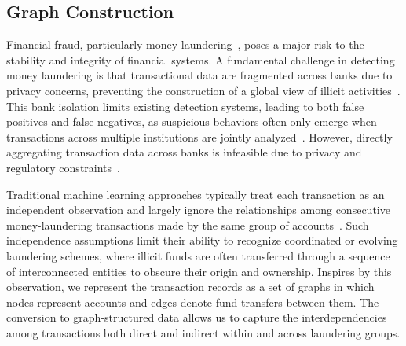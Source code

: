 \subsection{Graph Construction}
Financial fraud, particularly money laundering~\parencite{chen2018machine}, poses a major risk to the stability and integrity of financial systems. A fundamental challenge in detecting money laundering is that transactional data are fragmented across banks due to privacy concerns, preventing the construction of a global view of illicit activities~\parencite{le2018preventing, van2024privacy}. This bank isolation limits existing detection systems, leading to both false positives and false negatives, as suspicious behaviors often only emerge when transactions across multiple institutions are jointly analyzed~\parencite{wang2024temporal, amoako2025exploring}. However, directly aggregating transaction data across banks is infeasible due to privacy and regulatory constraints~\parencite{thommandru2023exploring}. 

Traditional machine learning approaches typically treat each transaction as an independent observation and largely ignore the relationships among consecutive money-laundering transactions made by the same group of accounts~\parencite{wang2024temporal, amoako2025exploring, pettersson2022combating, alotibi2022money, jensen2023fighting, lokanan2024predicting}. Such independence assumptions limit their ability to recognize coordinated or evolving laundering schemes, where illicit funds are often transferred through a sequence of interconnected entities to obscure their origin and ownership. Inspires by this observation, we represent the transaction records as a set of graphs in which nodes represent accounts and edges denote fund transfers between them. The conversion to graph-structured data allows us to capture the interdependencies among transactions both direct and indirect within and across laundering groups. 



